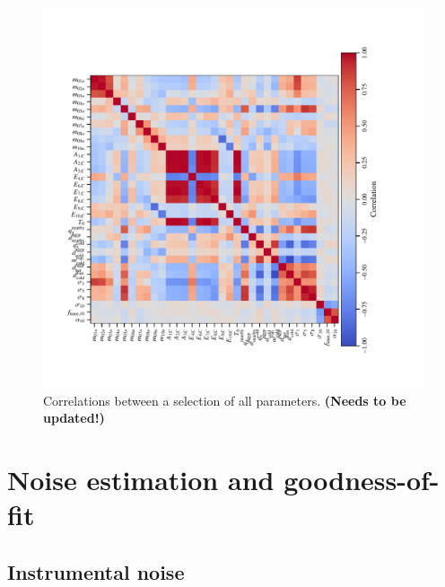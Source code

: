 \documentclass{aa}
\begin{document}
\begin{figure}
    \centering
    \includegraphics[width=1\textwidth]{figs/covmatrix.pdf}
    \caption{Correlations between a selection of all parameters. {\bf (Needs to be updated!)}}
    \label{fig:correlations}
\end{figure}


\section{Noise estimation and goodness-of-fit}
\label{sec:noise_gof}

\subsection{Instrumental noise}
\end{document}
